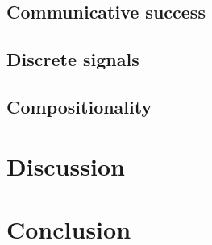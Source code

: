\documentclass[11pt,a4paper]{article}
\begin{document}
\subsection{Communicative success}


\subsection{Discrete signals}

\subsection{Compositionality}

\section{Discussion}

\section{Conclusion}



\cite{Steinert-Threlkeld2019}



\end{document}
